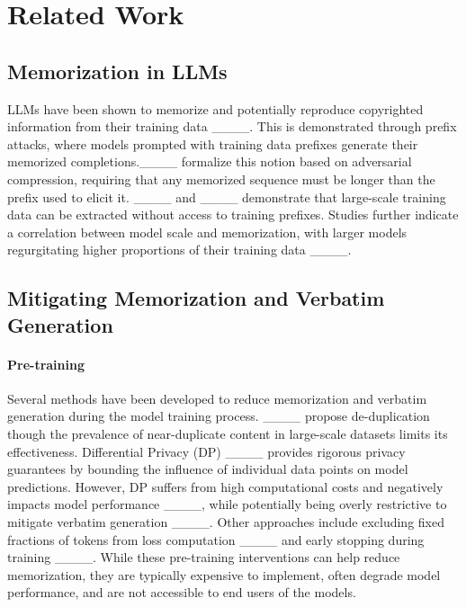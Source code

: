 \section{Related Work}
\subsection{Memorization in LLMs}
LLMs have been shown to memorize and potentially reproduce copyrighted information from their training data ____.  This is demonstrated through prefix attacks, where models prompted with training data prefixes generate their memorized completions.____ formalize this notion based on adversarial compression, requiring that any memorized sequence must be longer than the prefix used to elicit it. ____ and ____ demonstrate that large-scale training data can be extracted without access to training prefixes. Studies further indicate a correlation between model scale and memorization, with larger models regurgitating higher proportions of their training data ____.


\subsection{Mitigating Memorization and Verbatim Generation}

\paragraph{Pre-training}
Several methods have been developed to reduce memorization and verbatim generation during the model training process. ____ propose de-duplication though the prevalence of near-duplicate content in large-scale datasets limits its effectiveness. Differential Privacy (DP) ____ provides rigorous privacy guarantees by bounding the influence of individual data points on model predictions. However, DP suffers from high computational costs and negatively impacts model performance ____, while potentially being overly restrictive to mitigate verbatim generation ____. Other approaches include excluding fixed fractions of tokens from loss computation ____ and early stopping during training ____. While these pre-training interventions can help reduce memorization, they are typically expensive to implement, often degrade model performance, and are not accessible to end users of the models.

